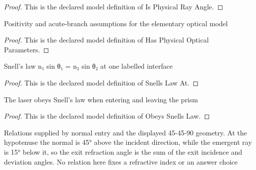\begin{proof}
  This is the declared model definition of Is Physical Ray Angle.
\end{proof}
\begin{definition}
  \label{def:physics:phyx-mini-0006:phyxminiproblems-problemphyxmini0006-hasphysicalopticalparameters}
  Positivity and acute-branch assumptions for the elementary optical model
\end{definition}
\begin{proof}
  This is the declared model definition of Has Physical Optical Parameters.
\end{proof}
\begin{definition}
  \label{def:physics:phyx-mini-0006:phyxminiproblems-problemphyxmini0006-snellslawat}
  Snell's law n₁ sin θ₁ = n₂ sin θ₂ at one labelled interface
\end{definition}
\begin{proof}
  This is the declared model definition of Snells Law At.
\end{proof}
\begin{definition}
  \label{def:physics:phyx-mini-0006:phyxminiproblems-problemphyxmini0006-obeyssnellslaw}
  The laser obeys Snell's law when entering and leaving the prism
\end{definition}
\begin{proof}
  This is the declared model definition of Obeys Snells Law.
\end{proof}
\begin{definition}
  \label{def:physics:phyx-mini-0006:phyxminiproblems-problemphyxmini0006-matchesprismraygeometry}
  Relations supplied by normal entry and the displayed 45-45-90 geometry. At the hypotenuse the normal is 45° above the incident direction, while the emergent ray is 15° below it, so the exit refraction angle is the sum of the exit incidence and deviation angles. No relation here fixes a refractive index or an answer choice
\end{definition}

